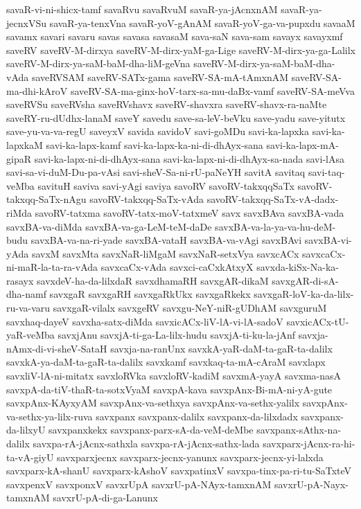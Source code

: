 {savaR-vi-ni-shicx-tamf
savaRvu
savaRvuM
savaR-ya-jAcnxnAM
savaR-ya-jecnxVSu
savaR-ya-tenxVna
savaR-yoV-gAnAM
savaR-yoV-ga-va-pupxdu
savaaM
savamx
savari
savaru
savas
savasa
savasaM
sava-saN
sava-sam
savayx
savayxmf
saveRV
saveRV-M-dirxya
saveRV-M-dirx-yaM-ga-Lige
saveRV-M-dirx-ya-ga-Lalilx
saveRV-M-dirx-ya-saM-baM-dha-liM-geVna
saveRV-M-dirx-ya-saM-baM-dha-vAda
saveRVSAM
saveRV-SATx-gama
saveRV-SA-mA-tAmxnAM
saveRV-SA-ma-dhi-kAroV
saveRV-SA-ma-ginx-hoV-tarx-sa-mu-daBx-vamf
saveRV-SA-meVva
saveRVSu
saveRVsha
saveRVshavx
saveRV-shavxra
saveRV-shavx-ra-naMte
saveRY-ru-dUdhx-lanaM
saveY
savedu
save-sa-leV-beVku
save-yadu
save-yitutx
save-yu-va-va-regU
saveyxV
savida
savidoV
savi-goMDu
savi-ka-lapxka
savi-ka-lapxkaM
savi-ka-lapx-kamf
savi-ka-lapx-ka-ni-di-dhAyx-sana
savi-ka-lapx-mA-gipaR
savi-ka-lapx-ni-di-dhAyx-sana
savi-ka-lapx-ni-di-dhAyx-sa-nada
savi-lAsa
savi-sa-vi-duM-Du-pa-vAsi
savi-sheV-Sa-ni-rU-paNeYH
savitA
savitaq
savi-taq-veMba
savituH
saviva
savi-yAgi
saviya
savoRV
savoRV-takxqqSaTx
savoRV-takxqq-SaTx-nAgu
savoRV-takxqq-SaTx-vAda
savoRV-takxqq-SaTx-vA-dadx-riMda
savoRV-tatxma
savoRV-tatx-moV-tatxmeV
savx
savxBAva
savxBA-vada
savxBA-va-diMda
savxBA-va-ga-LeM-teM-daDe
savxBA-va-la-ya-va-hu-deM-budu
savxBA-va-na-ri-yade
savxBA-vataH
savxBA-va-vAgi
savxBAvi
savxBA-vi-yAda
savxM
savxMta
savxNaR-liMgaM
savxNaR-setxVya
savxcACx
savxcaCx-ni-maR-la-ta-ra-vAda
savxcaCx-vAda
savxci-caCxkAtxyX
savxda-kiSx-Na-ka-rasayx
savxdeV-ha-da-lilxdaR
savxdhamaRH
savxgAR-dikaM
savxgAR-di-sA-dha-namf
savxgaR
savxgaRH
savxgaRkUkx
savxgaRkekx
savxgaR-loV-ka-da-lilx-ru-va-varu
savxgaR-vilalx
savxgeRV
savxgu-NeY-niR-gUDhAM
savxguruM
savxhaq-dayeV
savxha-satx-diMda
savxicACx-liV-lA-vi-lA-sadoV
savxicACx-tU-yaR-veMba
savxjAnu
savxjA-ti-ga-La-lilx-hudu
savxjA-ti-ku-la-jAnf
savxja-nAmx-di-vi-sheV-SataH
savxja-na-ranUnx
savxkA-yaR-daM-ta-gaR-ta-dalilx
savxkA-ya-daM-ta-gaR-ta-dalilx
savxkamf
savxkaq-ta-mA-cAraM
savxlapx
savxliV-lA-ni-mitatx
savxloRVka
savxloRV-kadiM
savxmA-yayA
savxma-nasA
savxpA-da-tiV-thaR-ta-sotxVyaM
savxpA-kava
savxpAnx-Bi-mA-ni-yA-gute
savxpAnx-KAyxyAM
savxpAnx-va-sethxya
savxpAnx-va-sethx-yalilx
savxpAnx-va-sethx-ya-lilx-ruva
savxpanx
savxpanx-dalilx
savxpanx-da-lilxdadx
savxpanx-da-lilxyU
savxpanxkekx
savxpanx-parx-sA-da-veM-deMbe
savxpanx-sAthx-na-dalilx
savxpa-rA-jAcnx-sathxla
savxpa-rA-jAcnx-sathx-lada
savxparx-jAcnx-ra-hi-ta-vA-giyU
savxparxjecnx
savxparx-jecnx-yanunx
savxparx-jecnx-yi-lalxda
savxparx-kA-shanU
savxparx-kAshoV
savxpatinxV
savxpa-tinx-pa-ri-tu-SaTxteV
savxpenxV
savxponxV
savxrUpA
savxrU-pA-NAyx-tamxnAM
savxrU-pA-Nayx-tamxnAM
savxrU-pA-di-ga-Lanunx
}

